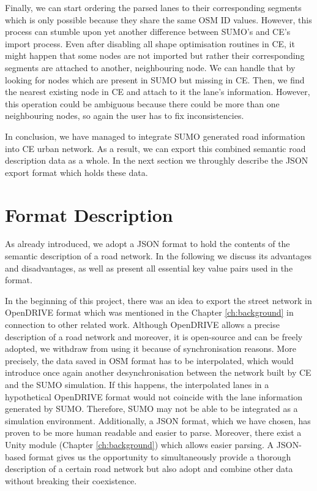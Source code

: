 Finally, we can start ordering the parsed lanes to their corresponding segments which is only possible because they share the same OSM ID values. However, this process can stumble upon yet another difference between SUMO's and CE's import process. Even after disabling all shape optimisation routines in CE, it might happen that some nodes are not imported but rather their corresponding segments are attached to another, neighbouring node. We can handle that by looking for nodes which are present in SUMO but missing in CE. Then, we find the nearest existing node in CE and attach to it the lane's information. However, this operation could be ambiguous because there could be more than one neighbouring nodes, so again the user has to fix inconsistencies. 

In conclusion, we have managed to integrate SUMO generated road information into CE urban network. As a result, we can export this combined semantic road description data as a whole. In the next section we throughly describe the JSON export format which holds these data.

\section{Format Description}
\label{sec:format}
As already introduced, we adopt a JSON format to hold the contents of the semantic description of a road network. In the following we discuss its advantages and disadvantages, as well as present all essential key value pairs used in the format.

In the beginning of this project, there was an idea to export the street network in OpenDRIVE format which was mentioned in the Chapter \ref{ch:background} in connection to other related work. Although OpenDRIVE allows a precise description of a road network and moreover, it is open-source and can be freely adopted, we withdraw from using it because of synchronisation reasons. More precisely, the data saved in OSM format has to be interpolated\cite{shi2011automatic}, which would introduce once again another desynchronisation between the network built by CE and the SUMO simulation. If this happens, the interpolated lanes in a hypothetical OpenDRIVE format would not coincide with the lane information generated by SUMO. Therefore, SUMO may not be able to be integrated as a simulation environment. Additionally, a JSON format, which we have chosen, has proven to be more human readable and easier to parse. Moreover, there exist a Unity module (Chapter \ref{ch:background}) which allows easier parsing. A JSON-based format gives us the opportunity to simultaneously provide a thorough description of a certain road network but also adopt and combine other data without breaking their coexistence. 

